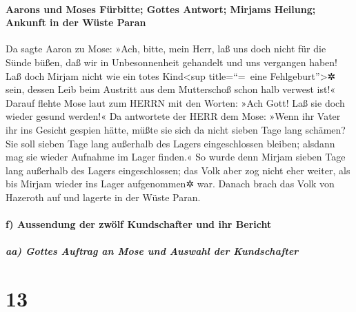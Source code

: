 \hypertarget{aarons-und-moses-fuxfcrbitte-gottes-antwort-mirjams-heilung-ankunft-in-der-wuxfcste-paran}{%
\paragraph{Aarons und Moses Fürbitte; Gottes Antwort; Mirjams Heilung;
Ankunft in der Wüste
Paran}\label{aarons-und-moses-fuxfcrbitte-gottes-antwort-mirjams-heilung-ankunft-in-der-wuxfcste-paran}}

Da sagte Aaron zu Mose: »Ach, bitte, mein Herr, laß uns
doch nicht für die Sünde büßen, daß wir in Unbesonnenheit gehandelt und
uns vergangen haben! Laß doch Mirjam nicht wie ein totes
Kind\textless sup title=``=~eine Fehlgeburt''\textgreater✲ sein, dessen
Leib beim Austritt aus dem Mutterschoß schon halb verwest ist!«
Darauf flehte Mose laut zum HERRN mit den Worten: »Ach
Gott! Laß sie doch wieder gesund werden!« Da antwortete
der HERR dem Mose: »Wenn ihr Vater ihr ins Gesicht gespien hätte, müßte
sie sich da nicht sieben Tage lang schämen? Sie soll sieben Tage lang
außerhalb des Lagers eingeschlossen bleiben; alsdann mag sie wieder
Aufnahme im Lager finden.« So wurde denn Mirjam sieben
Tage lang außerhalb des Lagers eingeschlossen; das Volk aber zog nicht
eher weiter, als bis Mirjam wieder ins Lager aufgenommen✲ war.
Danach brach das Volk von Hazeroth auf und lagerte in der
Wüste Paran.

\hypertarget{f-aussendung-der-zwuxf6lf-kundschafter-und-ihr-bericht}{%
\paragraph{f) Aussendung der zwölf Kundschafter und ihr
Bericht}\label{f-aussendung-der-zwuxf6lf-kundschafter-und-ihr-bericht}}

\hypertarget{aa-gottes-auftrag-an-mose-und-auswahl-der-kundschafter}{%
\subparagraph{aa) Gottes Auftrag an Mose und Auswahl der
Kundschafter}\label{aa-gottes-auftrag-an-mose-und-auswahl-der-kundschafter}}

\hypertarget{section-12}{%
\section{13}\label{section-12}}

